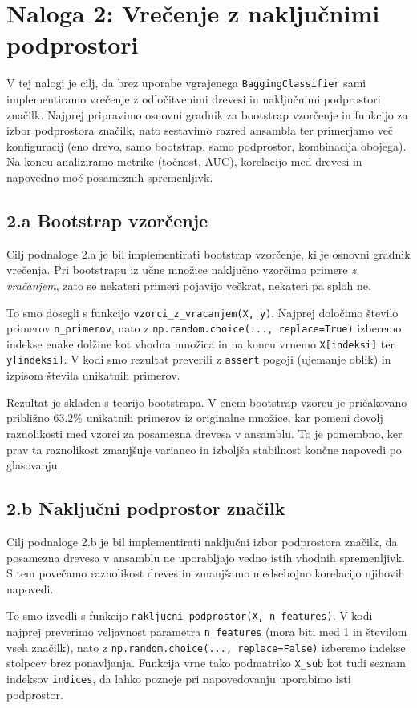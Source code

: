 \documentclass[12pt,a4paper]{article}
\begin{document}
\section*{Naloga 2: Vrečenje z naključnimi podprostori}

V tej nalogi je cilj, da brez uporabe vgrajenega \texttt{BaggingClassifier} sami implementiramo vrečenje z odločitvenimi drevesi in naključnimi podprostori značilk. Najprej pripravimo osnovni gradnik za bootstrap vzorčenje in funkcijo za izbor podprostora značilk, nato sestavimo razred ansambla ter primerjamo več konfiguracij (eno drevo, samo bootstrap, samo podprostor, kombinacija obojega). Na koncu analiziramo metrike (točnost, AUC), korelacijo med drevesi in napovedno moč posameznih spremenljivk.

\subsection*{2.a Bootstrap vzorčenje}
Cilj podnaloge 2.a je bil implementirati bootstrap vzorčenje, ki je osnovni gradnik vrečenja. Pri bootstrapu iz učne množice naključno vzorčimo primere \emph{z vračanjem}, zato se nekateri primeri pojavijo večkrat, nekateri pa sploh ne.

To smo dosegli s funkcijo \texttt{vzorci\_z\_vracanjem(X, y)}. Najprej določimo število primerov \texttt{n\_primerov}, nato z \texttt{np.random.choice(..., replace=True)} izberemo indekse enake dolžine kot vhodna množica in na koncu vrnemo \texttt{X[indeksi]} ter \texttt{y[indeksi]}. V kodi smo rezultat preverili z \texttt{assert} pogoji (ujemanje oblik) in izpisom števila unikatnih primerov.

Rezultat je skladen s teorijo bootstrapa. V enem bootstrap vzorcu je pričakovano približno $63.2\%$ unikatnih primerov iz originalne množice, kar pomeni dovolj raznolikosti med vzorci za posamezna drevesa v ansamblu. To je pomembno, ker prav ta raznolikost zmanjšuje varianco in izboljša stabilnost končne napovedi po glasovanju.

\subsection*{2.b Naključni podprostor značilk}
Cilj podnaloge 2.b je bil implementirati naključni izbor podprostora značilk, da posamezna drevesa v ansamblu ne uporabljajo vedno istih vhodnih spremenljivk. S tem povečamo raznolikost dreves in zmanjšamo medsebojno korelacijo njihovih napovedi.

To smo izvedli s funkcijo \texttt{nakljucni\_podprostor(X, n\_features)}. V kodi najprej preverimo veljavnost parametra \texttt{n\_features} (mora biti med 1 in številom vseh značilk), nato z \texttt{np.random.choice(..., replace=False)} izberemo indekse stolpcev brez ponavljanja. Funkcija vrne tako podmatriko \texttt{X\_sub} kot tudi seznam indeksov \texttt{indices}, da lahko pozneje pri napovedovanju uporabimo isti podprostor.
\end{document}
